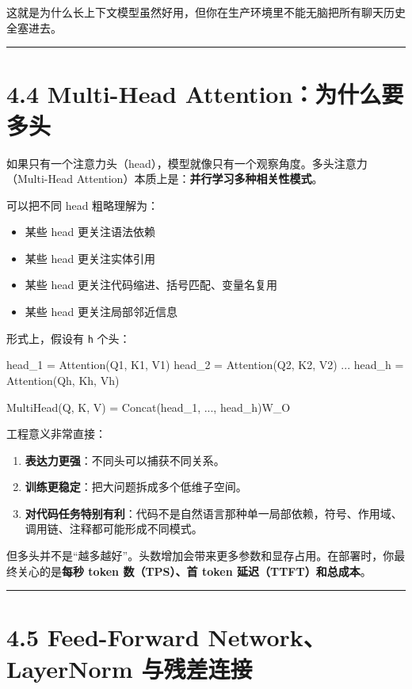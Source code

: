 这就是为什么长上下文模型虽然好用，但你在生产环境里不能无脑把所有聊天历史全塞进去。


\bigskip\hrule\bigskip

\section{4.4 Multi-Head Attention：为什么要多头}

如果只有一个注意力头（head），模型就像只有一个观察角度。多头注意力（Multi-Head Attention）本质上是：\textbf{并行学习多种相关性模式}。


可以把不同 head 粗略理解为：


\begin{itemize}[leftmargin=2em]
\item 某些 head 更关注语法依赖
\item 某些 head 更关注实体引用
\item 某些 head 更关注代码缩进、括号匹配、变量名复用
\item 某些 head 更关注局部邻近信息
\end{itemize}

形式上，假设有 \texttt{h} 个头：


\begin{codeblock}
head_1 = Attention(Q1, K1, V1)
head_2 = Attention(Q2, K2, V2)
...
head_h = Attention(Qh, Kh, Vh)

MultiHead(Q, K, V) = Concat(head_1, ..., head_h)W_O
\end{codeblock}

工程意义非常直接：


\begin{enumerate}[leftmargin=2em]
\item \textbf{表达力更强}：不同头可以捕获不同关系。
\item \textbf{训练更稳定}：把大问题拆成多个低维子空间。
\item \textbf{对代码任务特别有利}：代码不是自然语言那种单一局部依赖，符号、作用域、调用链、注释都可能形成不同模式。
\end{enumerate}

但多头并不是``越多越好''。头数增加会带来更多参数和显存占用。在部署时，你最终关心的是\textbf{每秒 token 数（TPS）、首 token 延迟（TTFT）和总成本}。


\bigskip\hrule\bigskip

\section{4.5 Feed-Forward Network、LayerNorm 与残差连接}

